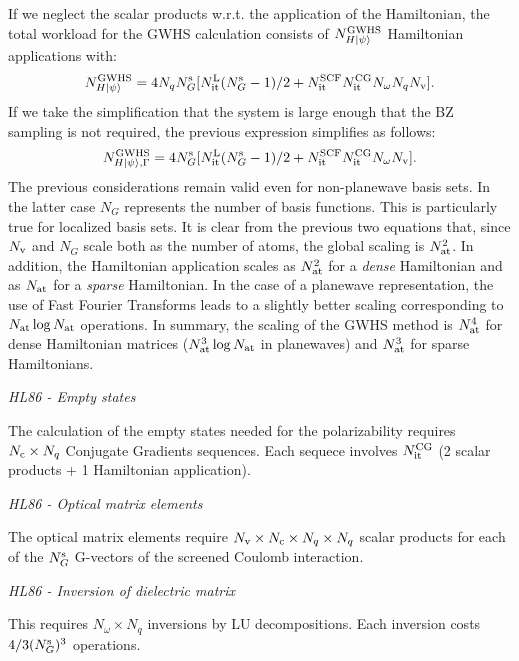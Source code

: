 \documentclass[12pt]{article}
\begin{document}
\noindent
If we neglect the scalar products w.r.t. the application of the Hamiltonian, the
total workload for the GWHS calculation consists of $N_{H|\psi\rangle}^{\rm GWHS}$
Hamiltonian applications with:
  \begin{equation}
  N_{H|\psi\rangle}^{\rm GWHS} = 4 N_q  N_G^{\rm s} [N_{\rm it}^{\rm L} (N_G^{\rm s} -1 )/2 +
  N_{\rm it}^{\rm SCF} N_{\rm it}^{\rm CG} N_\omega N_q N_{\rm v} ]. 
  \end{equation}
If we take the simplification that the system is large enough that the BZ sampling
is not required, the previous expression simplifies as follows:
  \begin{equation}
  N_{H|\psi\rangle,\Gamma}^{\rm GWHS} = 4 N_G^{\rm s} [N_{\rm it}^{\rm L} (N_G^{\rm s} -1 )/2 +
  N_{\rm it}^{\rm SCF} N_{\rm it}^{\rm CG} N_\omega N_{\rm v} ]. 
  \end{equation}
The previous considerations remain valid even for non-planewave basis sets.
In the latter case $N_G$ represents the number of basis functions. This is particularly
true for localized basis sets.
It is clear from the previous two equations that, since $N_{\rm v}$ and $N_G$ scale both
as the number of atoms, the global scaling is $N_{\rm at}^2$. In addition, the Hamiltonian
application scales as $N_{\rm at}^2$ for a {\it dense} Hamiltonian and as $N_{\rm at}$
for a {\it sparse} Hamiltonian. In the case of a planewave representation, the use of 
Fast Fourier Transforms leads to a slightly better scaling corresponding to $N_{\rm at}\log N_{\rm at}$
operations. In summary, the scaling of the GWHS method is $N_{\rm at}^4$ for dense Hamiltonian
matrices ($N_{\rm at}^3\log N_{\rm at}$ in planewaves) and $N_{\rm at}^3$ for sparse Hamiltonians.

\noindent
{\it HL86 - Empty states} 

\noindent
The calculation of the empty states needed for the polarizability requires
$N_{\rm c}\times N_q$ Conjugate Gradients sequences. Each sequece involves
$N_{\rm it}^{\rm CG}$ (2 scalar products + 1 Hamiltonian application).

\noindent
{\it HL86 - Optical matrix elements} 

\noindent
The optical matrix elements require $N_{\rm v} \times N_{\rm c}\times N_q\times N_q$
scalar products for each of the $N_G^{\rm s}$ G-vectors of the screened Coulomb interaction.

\noindent
{\it HL86 - Inversion of dielectric matrix} 

\noindent
This requires $N_\omega \times N_q$ inversions by LU decompositions. Each inversion
costs $4/3(N_G^{\rm s})^3$ operations.
\end{document}
